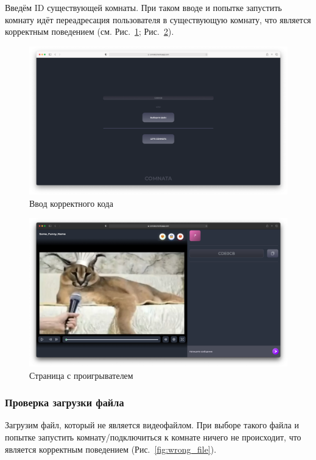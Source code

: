 \documentclass{../../includes/TechDocMultiAuthors}
\begin{document}
    Введём ID существующей комнаты. При таком вводе и попытке запустить комнату идёт переадресация пользователя в существующую комнату, что является корректным поведением (см. Рис.~\ref{fig:right_code}; Рис.~\ref{fig:player}).

    \begin{figure}[H]
        \centering
        \includegraphics[width=0.9\linewidth]{../images/right_code.png}
        \caption{Ввод корректного кода}
        \label{fig:right_code}
    \end{figure}

    \begin{figure}[H]
        \centering
        \includegraphics[width=0.9\linewidth]{../images/player.png}
        \caption{Страница с проигрывателем}
        \label{fig:player}
    \end{figure}

    \subsubsection{Проверка загрузки файла}

    Загрузим файл, который не является видеофайлом.
    При выборе такого файла и попытке запустить комнату/подключиться к комнате ничего не происходит, что является корректным поведением (Рис.~\ref{fig:wrong_file}).
\end{document}

